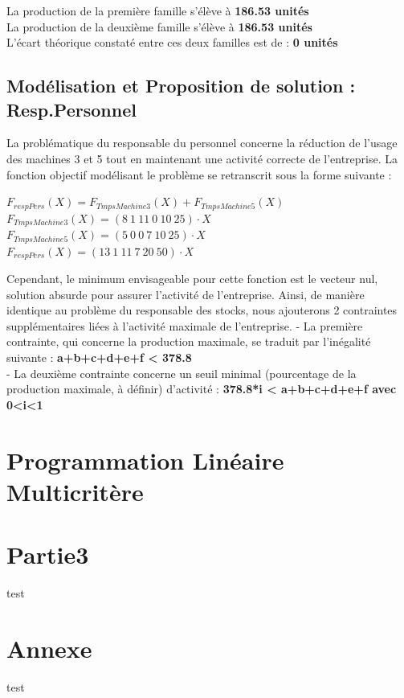 \documentclass[a4paper, 11pt]{article}
\begin{document}
La production de la première famille s'élève à \textbf{186.53 unités}\\
La production de la deuxième famille s'élève à \textbf{186.53 unités}\\
L'écart théorique constaté entre ces deux familles est de : \textbf{0 unités}
\subsection{Modélisation et Proposition de solution : Resp.Personnel}
La problématique du responsable du personnel concerne la réduction de l'usage des machines 3 et 5 tout en maintenant une activité correcte de l'entreprise.
La fonction objectif modélisant le problème se retranscrit sous la forme suivante :
\begin{center}
$F_{respPers} (X) =F_{TmpsMachine3} (X) + F_{TmpsMachine5} (X)$\\
$F_{TmpsMachine3} (X) = (8~1~11~0~10~25)\cdot X$\\
$F_{TmpsMachine5} (X) = (5~0~0~7~10~25)\cdot X$\\
$F_{respPers} (X) =(13~1~11~7~20~50)\cdot X$
\end{center}

Cependant, le minimum envisageable pour cette fonction est le vecteur nul, solution absurde pour assurer l'activité de l'entreprise. Ainsi, de manière identique au problème du responsable des stocks, nous ajouterons 2 contraintes supplémentaires liées à l'activité maximale de l'entreprise.
- La première contrainte, qui concerne la production maximale, se traduit par l'inégalité suivante :
\textbf{a+b+c+d+e+f < 378.8}\\
- La deuxième contrainte concerne un seuil minimal (pourcentage de la production maximale, à définir) d'activité :
\textbf{ 378.8*i < a+b+c+d+e+f avec 0<i<1}\\


\section{Programmation Linéaire Multicritère}

\section{Partie3}
test

\section*{Annexe}
test
\end{document}
